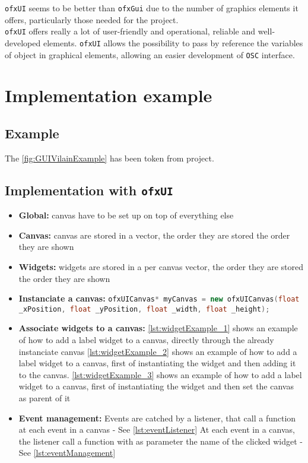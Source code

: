 \documentclass[a4paper,titlepage,oneside]{article}
\begin{document}
\texttt{ofxUI} seems to be better than \texttt{ofxGui} due to the number of graphics elements it offers, particularly those needed for the project.\\\texttt{ofxUI} offers really a lot of user-friendly and operational, reliable and well-developed elements.
\texttt{ofxUI} allows the possibility to pass by reference the variables of object in graphical elements, allowing an easier development of \texttt{OSC} interface.

\newpage
\section{Implementation example}
\subsection{Example}
The \figurename \ref{fig:GUIVilainExample} has been token from \vilain{} project.  \newpage


\subsection{Implementation with \texttt{ofxUI}}
\begin{itemize}
	\item \textbf{Global:} canvas have to be set up on top of everything else 
	\item \textbf{Canvas:} canvas are stored in a vector, the order they are stored the order they are shown
	\item \textbf{Widgets:} widgets are stored in a per canvas vector, the order they are stored the order they are shown

	\item \textbf{Instanciate a canvas:} \lstinline[language=C++]{ofxUICanvas* myCanvas = new ofxUICanvas(float _xPosition, float _yPosition, float _width, float _height);}
	
	\item \textbf{Associate widgets to a canvas:}
		\subitem \lstlistingname{} \vref{lst:widgetExample_1} shows an example of how to add a label widget to a canvas, directly through the already instanciate canvas
		\subitem \lstlistingname{} \vref{lst:widgetExample_2} shows an example of how to add a label widget to a canvas, first of instantiating the widget and then adding it to the canvas.
		\subitem \lstlistingname{} \vref{lst:widgetExample_3} shows an example of how to add a label widget to a canvas, first of instantiating the widget and then set the canvas as parent of it

	\item \textbf{Event management:}
		\subitem Events are catched by a listener, that call a function at each event in a canvas - See \lstlistingname{} \vref{lst:eventListener}
		\subitem At each event in a canvas, the listener call a function with as parameter the name of the clicked widget - See \lstlistingname{} \ref{lst:eventManagement}
\end{itemize}
\end{document}
